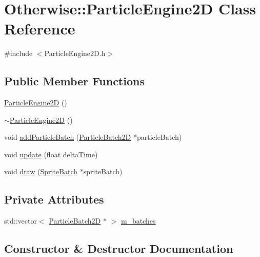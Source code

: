 \hypertarget{class_otherwise_1_1_particle_engine2_d}{}\section{Otherwise\+:\+:Particle\+Engine2D Class Reference}
\label{class_otherwise_1_1_particle_engine2_d}


{\ttfamily \#include $<$Particle\+Engine2\+D.\+h$>$}

\subsection*{Public Member Functions}
\begin{DoxyCompactItemize}
\item 
\hyperlink{class_otherwise_1_1_particle_engine2_d_a8670e6350a6cf4d15e0604b87408744b}{Particle\+Engine2D} ()
\item 
\hyperlink{class_otherwise_1_1_particle_engine2_d_a268b109e44f399b79c4bd70e16f11946}{$\sim$\+Particle\+Engine2D} ()
\item 
void \hyperlink{class_otherwise_1_1_particle_engine2_d_a13f9168fb8f0dcd67adcf5252faf4332}{add\+Particle\+Batch} (\hyperlink{class_otherwise_1_1_particle_batch2_d}{Particle\+Batch2D} $\ast$particle\+Batch)
\item 
void \hyperlink{class_otherwise_1_1_particle_engine2_d_a11417f9e2a242caa157aa2ba1629efb6}{update} (float delta\+Time)
\item 
void \hyperlink{class_otherwise_1_1_particle_engine2_d_a16f68c082ca83f9a6f51eec264ed2662}{draw} (\hyperlink{class_otherwise_1_1_sprite_batch}{Sprite\+Batch} $\ast$sprite\+Batch)
\end{DoxyCompactItemize}
\subsection*{Private Attributes}
\begin{DoxyCompactItemize}
\item 
std\+::vector$<$ \hyperlink{class_otherwise_1_1_particle_batch2_d}{Particle\+Batch2D} $\ast$ $>$ \hyperlink{class_otherwise_1_1_particle_engine2_d_afc581878180d5b2b33c5a1b94149fba0}{m\+\_\+batches}
\end{DoxyCompactItemize}


\subsection{Constructor \& Destructor Documentation}
\mbox{\label{class_otherwise_1_1_particle_engine2_d_a8670e6350a6cf4d15e0604b87408744b}} 
